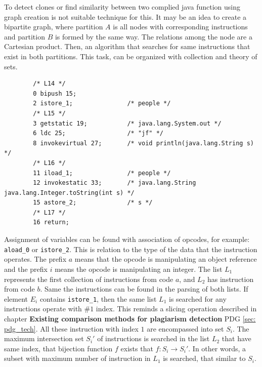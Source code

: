 \documentclass{report}
\begin{document}
To detect clones or find similarity between two complied java function using graph creation is not suitable technique for this. It may be an idea to create a bipartite graph, where partition $A$ is all nodes with corresponding instructions and partition $B$ is formed by the same way. The relations among the node are a Cartesian product. Then, an algorithm that searches for same instructions that exist in both partitions. This task, can be organized with collection and theory of sets.
\begin{lstlisting}
        /* L14 */
        0 bipush 15;
        2 istore_1;               /* people */
        /* L15 */
        3 getstatic 19;           /* java.lang.System.out */
        6 ldc 25;                 /* "jf" */
        8 invokevirtual 27;       /* void println(java.lang.String s) */
        /* L16 */
        11 iload_1;               /* people */
        12 invokestatic 33;       /* java.lang.String java.lang.Integer.toString(int s) */
        15 astore_2;              /* s */
        /* L17 */
        16 return;
\end{lstlisting}

Assignment of variables can be found with association of opcodes, for example: \texttt{aload\_0} or \texttt{istore\_2}. 
This is relation to the type of the data that the instruction operates. The prefix $a$ means that the opcode is manipulating an object reference and the prefix $i$ means the opcode is manipulating an integer. 
The list $ L_{1}$ represents the first collection of instructions from code $a$, and $L_{2}$ has instruction from code $b$. 
Same the instructions can be found in the parsing of both lists.
If element $E_{i}$ contains \texttt{istore\_1}, then the same list $L_{1}$ is searched for any instructions operate with $\#1$ index. This reminds a slicing operation described in chapter \textbf{Existing comparison methods for plagiarism detection} PDG \ref{sec: pdg_tech}. All these instruction with index $1$ are encompassed into set $S_{i}$. The maximum intersection set $S_{i}'$ of instructions is searched in the list $L_{2}$ that have same index, that bijection function $f$ exists that $f: S_{i} \rightarrow S_{i}'$. In other words, a subset with maximum number of instruction in $L_{1}$ is searched, that similar to $S_{i}$.



%
\end{document}

